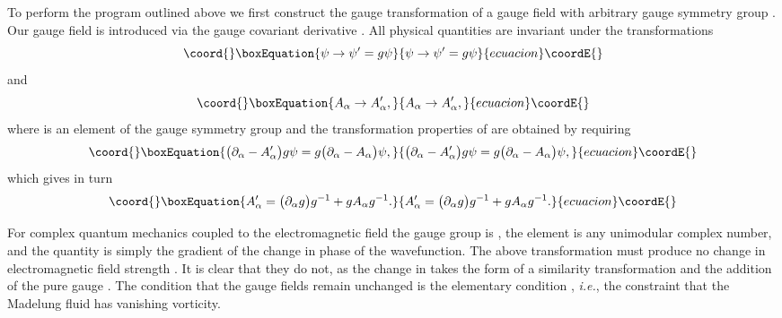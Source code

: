 \documentclass[a4paper,aps,prd,preprint,groupedaddress]{revtex4}
\begin{document}
To perform the program outlined above we first construct the gauge transformation of a gauge field \coordHE{} with arbitrary gauge symmetry group \coordHE{}. Our gauge field is introduced via the gauge covariant derivative \coordHE{}. All physical quantities are invariant under the transformations
\begin{equation}\coord{}\boxEquation{
\psi \rightarrow \psi'=g\psi
}{
\psi \rightarrow \psi'=g\psi
}{ecuacion}\coordE{}\end{equation}
and
\begin{equation}\coord{}\boxEquation{
A_\alpha \rightarrow A_\alpha',
}{
A_\alpha \rightarrow A_\alpha',
}{ecuacion}\coordE{}\end{equation}
where \coordHE{} is an element of the gauge symmetry group and the transformation properties of \coordHE{} are obtained by requiring
\begin{equation}\coord{}\boxEquation{
\bigl(\partial_\alpha - A'_\alpha\bigr)g\psi = g\bigl(\partial_\alpha- A_\alpha\bigr)\psi,
}{
\bigl(\partial_\alpha - A'_\alpha\bigr)g\psi = g\bigl(\partial_\alpha- A_\alpha\bigr)\psi,
}{ecuacion}\coordE{}\end{equation}
which gives in turn
\begin{equation}\coord{}\boxEquation{
A_\alpha'=\bigl(\partial_\alpha g\bigr)g^{-1} + gA_\alpha g^{-1}.
}{
A_\alpha'=\bigl(\partial_\alpha g\bigr)g^{-1} + gA_\alpha g^{-1}.
}{ecuacion}\coordE{}\end{equation}

For complex quantum mechanics coupled to the electromagnetic field the gauge group \coordHE{} is \coordHE{}, the element \coordHE{} is any unimodular complex number, and the quantity \coordHE{} is simply the gradient of the change in phase of the wavefunction. The above transformation must produce no change in electromagnetic field strength \coordHE{}. It is clear that they do not, as the change in \coordHE{} takes the form of a similarity transformation and the addition of the pure gauge \coordHE{}. The condition that the gauge fields remain unchanged is the elementary condition \coordHE{}, {\it i.e.}, the constraint that the Madelung fluid has vanishing vorticity.
 
\end{document}
